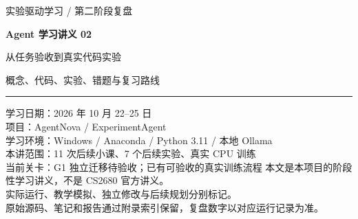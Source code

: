 \documentclass[UTF8,zihao=-4,fontset=fandol]{ctexart}
\begin{document}
\hypersetup{pageanchor=false}
\begin{titlepage}
\vspace*{14mm}
{\large\color{Accent}实验驱动学习 / 第二阶段复盘\par}
\vspace{10mm}
{\Huge\bfseries\color{Ink}Agent 学习讲义 02\par}
\vspace{6mm}
{\LARGE 从任务验收到真实代码实验\par}
\vspace{12mm}
{\large 概念、代码、实验、错题与复习路线\par}
\vspace{14mm}
\hrule
\vspace{6mm}
学习日期：2026 年 10 月 22--25 日\\
项目：AgentNova / ExperimentAgent\\
学习环境：Windows / Anaconda / Python 3.11 / 本地 Ollama\\
本讲范围：11 次后续小课、7 个后续实验、真实 CPU 训练\\
当前关卡：G1 独立迁移待验收；已有可验收的真实训练流程
\vfill
\small
本文是本项目的阶段性学习讲义，不是 CS2680 官方讲义。\\
实际运行、教学模拟、独立修改与后续规划分别标记。\\
原始源码、笔记和报告通过附录索引保留，复盘数字以对应运行记录为准。
\end{titlepage}
\hypersetup{pageanchor=true}
\tableofcontents
\clearpage
{}

\end{document}
